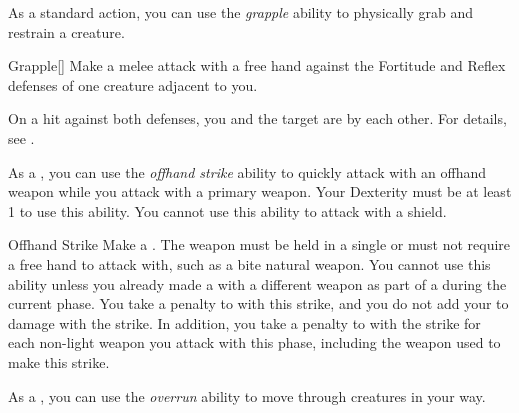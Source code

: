         \label{Grapple} As a standard action, you can use the \textit{grapple} ability to physically grab and restrain a creature.

        \begin{activeability}{Grapple}[]
            \rankline
            Make a melee attack with a free hand against the Fortitude and Reflex defenses of one creature adjacent to you.

            On a hit against both defenses, you and the target are \grappled by each other.
            For details, see .
        \end{activeability}

        \label{Offhand Strike} As a , you can use the \textit{offhand strike} ability to quickly attack with an offhand weapon while you attack with a primary weapon.
        Your Dexterity must be at least 1 to use this ability.
        You cannot use this ability to attack with a shield.
        \begin{activeability}{Offhand Strike}
            \rankline
            Make a .
            The weapon must be held in a single  or must not require a free hand to attack with, such as a bite natural weapon.
            You cannot use this ability unless you already made a  with a different weapon as part of a  during the current phase.
            You take a  penalty to  with this strike, and you do not add your  to damage with the strike.
            In addition, you take a  penalty to  with the strike for each non-light weapon you attack with this phase, including the weapon used to make this strike.
        \end{activeability}

        \label{Overrun} As a , you can use the \textit{overrun} ability to move through creatures in your way.

